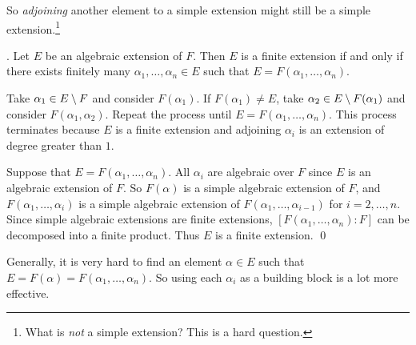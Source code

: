 So \textit{adjoining} another element to a simple extension might still be a simple extension.\footnote{What is \textit{not} a simple extension? This is a hard question.}

\thm. Let \(E\) be an algebraic extension of \(F\). Then \(E\) is a finite extension if and only if there exists finitely many \(\alpha_1, \dots, \alpha_n \in E\) such that \(E = F(\alpha_1, \dots, \alpha_n)\).

\pf \note{\mimp} Take \(\alpha_1 \in E \setminus F\) and consider \(F(\alpha_1)\). If \(F(\alpha_1) \neq E\), take \(\alpha_2 \in E \setminus F(\alpha_1)\) and consider \(F(\alpha_1, \alpha_2)\). Repeat the process until \(E = F(\alpha_1, \dots, \alpha_n)\). This process terminates because \(E\) is a finite extension and adjoining \(\alpha_i\) is an extension of degree greater than \(1\).

\note{\mimpd} Suppose that \(E = F(\alpha_1, \dots, \alpha_n)\). All \(\alpha_i\) are algebraic over \(F\) since \(E\) is an algebraic extension of \(F\). So \(F(\alpha)\) is a simple algebraic extension of \(F\), and \(F(\alpha_1, \dots, \alpha_{i})\) is a simple algebraic extension of \(F(\alpha_1, \dots, \alpha_{i - 1})\) for \(i = 2, \dots, n\). Since simple algebraic extensions are finite extensions, \([F(\alpha_1, \dots, \alpha_n) : F]\) can be decomposed into a finite product. Thus \(E\) is a finite extension. \qed

Generally, it is very hard to find an element \(\alpha \in E\) such that \(E = F(\alpha) = F(\alpha_1, \dots, \alpha_n)\). So using each \(\alpha_i\) as a building block is a lot more effective.

\pagebreak
